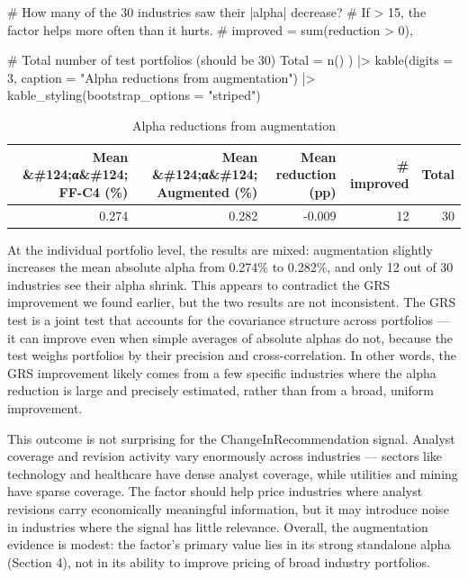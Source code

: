 \documentclass[
  letterpaper,
  DIV=11,
  numbers=noendperiod]{scrartcl}
\newenvironment{Shaded}{\begin{snugshade}}{\end{snugshade}}
\newcommand{\AttributeTok}[1]{\textcolor[rgb]{0.40,0.45,0.13}{#1}}
\newcommand{\CommentTok}[1]{\textcolor[rgb]{0.37,0.37,0.37}{#1}}
\newcommand{\DecValTok}[1]{\textcolor[rgb]{0.68,0.00,0.00}{#1}}
\newcommand{\FunctionTok}[1]{\textcolor[rgb]{0.28,0.35,0.67}{#1}}
\newcommand{\NormalTok}[1]{\textcolor[rgb]{0.00,0.23,0.31}{#1}}
\newcommand{\OtherTok}[1]{\textcolor[rgb]{0.00,0.23,0.31}{#1}}
\newcommand{\SpecialCharTok}[1]{\textcolor[rgb]{0.37,0.37,0.37}{#1}}
\newcommand{\StringTok}[1]{\textcolor[rgb]{0.13,0.47,0.30}{#1}}
\begin{document}
\begin{Shaded}
\begin{Highlighting}[]
    \CommentTok{\# How many of the 30 industries saw their |alpha| decrease?}
    \CommentTok{\# If \textgreater{} 15, the factor helps more often than it hurts.}
    \StringTok{\textasciigrave{}}\AttributeTok{\# improved}\StringTok{\textasciigrave{}} \OtherTok{=} \FunctionTok{sum}\NormalTok{(reduction }\SpecialCharTok{\textgreater{}} \DecValTok{0}\NormalTok{),}

    \CommentTok{\# Total number of test portfolios (should be 30)}
    \StringTok{\textasciigrave{}}\AttributeTok{Total}\StringTok{\textasciigrave{}} \OtherTok{=} \FunctionTok{n}\NormalTok{()}
\NormalTok{  ) }\SpecialCharTok{|\textgreater{}}
  \FunctionTok{kable}\NormalTok{(}\AttributeTok{digits =} \DecValTok{3}\NormalTok{, }\AttributeTok{caption =} \StringTok{"Alpha reductions from augmentation"}\NormalTok{) }\SpecialCharTok{|\textgreater{}}
  \FunctionTok{kable\_styling}\NormalTok{(}\AttributeTok{bootstrap\_options =} \StringTok{"striped"}\NormalTok{)}
\end{Highlighting}
\end{Shaded}

\begin{longtable}[t]{rrrrr}
\caption{\label{tab:spanning-alphas}Alpha reductions from augmentation}\\
\toprule
Mean \&\#124;α\&\#124; FF-C4 (\%) & Mean \&\#124;α\&\#124; Augmented (\%) & Mean reduction (pp) & \# improved & Total\\
\midrule
0.274 & 0.282 & -0.009 & 12 & 30\\
\bottomrule
\end{longtable}

At the individual portfolio level, the results are mixed: augmentation
slightly increases the mean absolute alpha from 0.274\% to 0.282\%, and
only 12 out of 30 industries see their alpha shrink. This appears to
contradict the GRS improvement we found earlier, but the two results are
not inconsistent. The GRS test is a joint test that accounts for the
covariance structure across portfolios --- it can improve even when
simple averages of absolute alphas do not, because the test weighs
portfolios by their precision and cross-correlation. In other words, the
GRS improvement likely comes from a few specific industries where the
alpha reduction is large and precisely estimated, rather than from a
broad, uniform improvement.

This outcome is not surprising for the ChangeInRecommendation signal.
Analyst coverage and revision activity vary enormously across industries
--- sectors like technology and healthcare have dense analyst coverage,
while utilities and mining have sparse coverage. The factor should help
price industries where analyst revisions carry economically meaningful
information, but it may introduce noise in industries where the signal
has little relevance. Overall, the augmentation evidence is modest: the
factor's primary value lies in its strong standalone alpha (Section 4),
not in its ability to improve pricing of broad industry portfolios.
\end{document}
